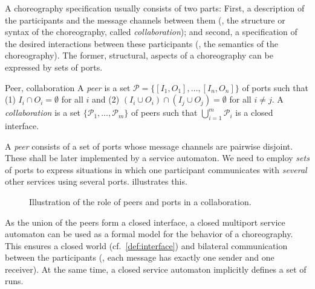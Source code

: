A choreography specification usually consists of two parts: First, a description of the participants and the message channels between them (\ie, the structure or syntax of the choreography, called \emph{collaboration}); and second, a specification of the desired interactions between these participants (\ie, the semantics of the choreography). The former, structural, aspects of a choreography can be expressed by sets of ports.

\begin{definition}{Peer, collaboration}
A \emph{peer} is a set $\mathcal{P}=\{[I_{1},O_{1}],\ldots,[I_{n},O_{n}]\}$ of ports such that (1) $I_{i}\cap O_{i}=\emptyset$ for all $i$ and (2) $(I_{i}\cup O_{i})\cap (I_{j}\cup O_{j})=\emptyset$ for all $i\neq j$. A \emph{collaboration} is a set $\{\mathcal{P}_{1},\ldots,\mathcal{P}_{m}\}$ of peers such that $\bigcup_{i=1}^{m} \mathcal{P}_{i}$ is a closed interface.
\end{definition}

A \emph{peer} consists of a set of ports whose message channels are pairwise disjoint. These shall be later implemented by a service automaton. We need to employ \emph{sets} of ports to express situations in which one participant communicates with \emph{several} other services using several ports.  illustrates this.

\begin{figure}
\centering
{}
\caption{Illustration of the role of peers and ports in a collaboration.}\label{fig:peerport}
\end{figure}

As the union of the peers form a closed interface, a closed multiport service automaton can be used as a formal model for the behavior of a choreography. This ensures a closed world (cf.\ \autoref{def:interface}) and bilateral communication between the participants (\ie, each message has exactly one sender and one receiver). At the same time, a closed service automaton implicitly defines a set of runs.

